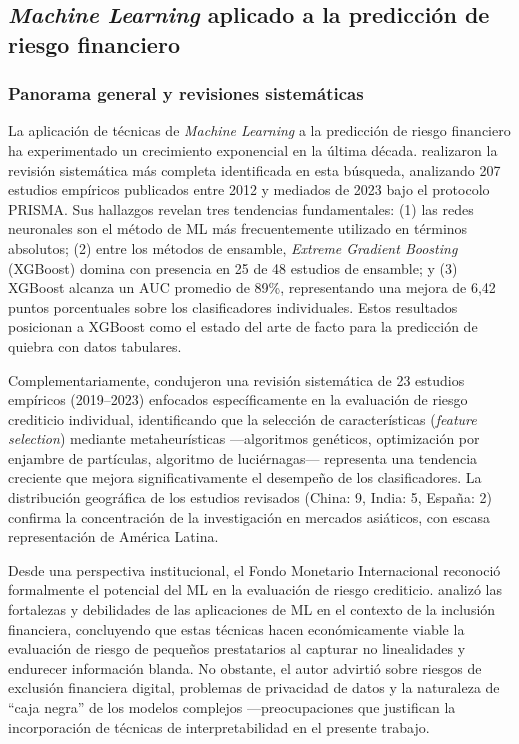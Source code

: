 \documentclass[12pt, letterpaper]{article}
\begin{document}
\subsection{\textit{Machine Learning} aplicado a la predicci\'on de riesgo financiero}
\label{sec:ml}

\subsubsection{Panorama general y revisiones sistem\'aticas}

La aplicaci\'on de t\'ecnicas de \textit{Machine Learning} a la predicci\'on de riesgo financiero ha experimentado un crecimiento exponencial en la \'ultima d\'ecada. \citet{Dasilas2024} realizaron la revisi\'on sistem\'atica m\'as completa identificada en esta b\'usqueda, analizando 207 estudios emp\'iricos publicados entre 2012 y mediados de 2023 bajo el protocolo PRISMA. Sus hallazgos revelan tres tendencias fundamentales: (1) las redes neuronales son el m\'etodo de ML m\'as frecuentemente utilizado en t\'erminos absolutos; (2) entre los m\'etodos de ensamble, \textit{Extreme Gradient Boosting} (XGBoost) domina con presencia en 25 de 48 estudios de ensamble; y (3) XGBoost alcanza un AUC promedio de 89\%, representando una mejora de 6,42 puntos porcentuales sobre los clasificadores individuales. Estos resultados posicionan a XGBoost como el estado del arte de facto para la predicci\'on de quiebra con datos tabulares.

Complementariamente, \citet{Paz2025} condujeron una revisi\'on sistem\'atica de 23 estudios emp\'iricos (2019--2023) enfocados espec\'ificamente en la evaluaci\'on de riesgo crediticio individual, identificando que la selecci\'on de caracter\'isticas (\textit{feature selection}) mediante metaheur\'isticas ---algoritmos gen\'eticos, optimizaci\'on por enjambre de part\'iculas, algoritmo de luci\'ernagas--- representa una tendencia creciente que mejora significativamente el desempe\~no de los clasificadores. La distribuci\'on geogr\'afica de los estudios revisados (China: 9, India: 5, Espa\~na: 2) confirma la concentraci\'on de la investigaci\'on en mercados asi\'aticos, con escasa representaci\'on de Am\'erica Latina.

Desde una perspectiva institucional, el Fondo Monetario Internacional reconoci\'o formalmente el potencial del ML en la evaluaci\'on de riesgo crediticio. \citet{Bazarbash2019} analiz\'o las fortalezas y debilidades de las aplicaciones de ML en el contexto de la inclusi\'on financiera, concluyendo que estas t\'ecnicas hacen econ\'omicamente viable la evaluaci\'on de riesgo de peque\~nos prestatarios al capturar no linealidades y endurecer informaci\'on blanda. No obstante, el autor advirti\'o sobre riesgos de exclusi\'on financiera digital, problemas de privacidad de datos y la naturaleza de ``caja negra'' de los modelos complejos ---preocupaciones que justifican la incorporaci\'on de t\'ecnicas de interpretabilidad en el presente trabajo.
\end{document}
